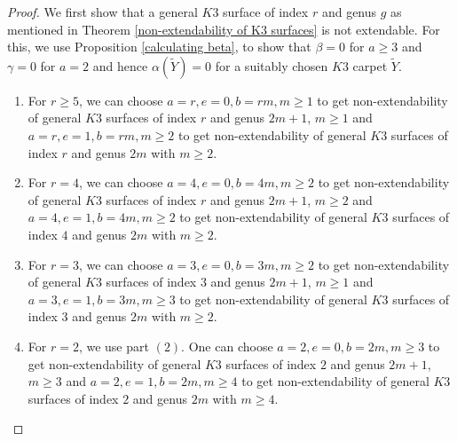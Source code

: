\documentclass[11pt,twoside]{amsart}
\theoremstyle{plain}
\numberwithin{equation}{section}
\theoremstyle{definition}
\begin{document}
\begin{proof}
    We first show that a general $K3$ surface of index $r$ and genus $g$ as mentioned in Theorem \ref{non-extendability of K3 surfaces} is not extendable. For this, we use Proposition \ref{calculating beta}, to show that $\beta = 0$ for $a \geq 3$ and $\gamma = 0$ for $a = 2$ and hence $\alpha(\widetilde{Y}) = 0$ for a suitably chosen $K3$ carpet $\widetilde{Y}$. 
    \begin{enumerate}
        \item[(1)] For $r \geq 5$, we can choose $a = r, e = 0, b = rm, m \geq 1$ to get non-extendability of general $K3$ surfaces of index $r$ and genus $2m+1$, $m \geq 1$ and $a = r, e = 1, b = rm, m \geq 2$ to get non-extendability of general $K3$ surfaces of index $r$ and genus $2m$ with $m \geq 2$. 

        \smallskip
        
        \item[(2)] For $r = 4$, we can choose $a = 4, e = 0, b = 4m, m \geq 2$ to get non-extendability of general $K3$ surfaces of index $r$ and genus $2m+1$, $m \geq 2$ and $a = 4, e = 1, b = 4m, m \geq 2$ to get non-extendability of general $K3$ surfaces of index $4$ and genus $2m$ with $m \geq 2$. 

       \smallskip
        
        \item[(3)] For $r = 3$, we can choose $a = 3, e = 0, b = 3m, m \geq 2$ to get non-extendability of general $K3$ surfaces of index $3$ and genus $2m+1$, $m \geq 1$ and $a = 3, e = 1, b = 3m, m \geq 3$ to get non-extendability of general $K3$ surfaces of index $3$ and genus $2m$ with $m \geq 2$. 
        
        \smallskip

        \item[(4)] For $r = 2$, we use part $(2)$. One can choose $a = 2, e = 0, b = 2m, m \geq 3$ to get non-extendability of general $K3$ surfaces of index $2$ and genus $2m+1$, $m \geq 3$ and $a = 2, e = 1, b = 2m, m \geq 4$ to get non-extendability of general $K3$ surfaces of index $2$ and genus $2m$ with $m \geq 4$.
        

\end{enumerate}
\end{proof}
\end{document}
